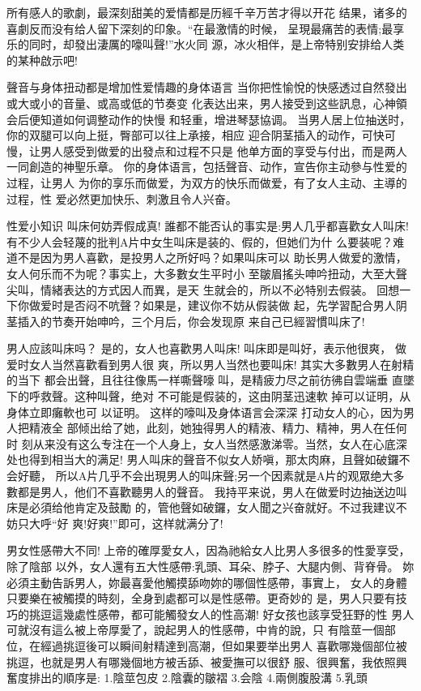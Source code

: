 \documentclass[12pt,UTF8]{ctexbook}
\begin{document}
所有感人的歌劇，最深刻甜美的爱情都是历經千辛万苦才得以开花
结果，诸多的喜劇反而没有给人留下深刻的印象。“在最激情的时候，
呈現最痛苦的表情;最享乐的同时，却發出淒厲的嚎叫聲!”水火同
源，冰火相伴，是上帝特别安排给人类的某种啟示吧!

聲音与身体扭动都是增加性爱情趣的身体语言
当你把性愉悅的快感透过自然發出或大或小的音量、或高或低的节奏变
化表达出来，男人接受到这些訊息，心神領会后便知道如何调整动作的快慢
和轻重，增进琴瑟協调。
当男人居上位抽送时，你的双腿可以向上挺，臀部可以往上承接，相应
迎合阴茎插入的动作，可快可慢，让男人感受到做爱的出發点和过程不只是
他单方面的享受与付出，而是两人一同創造的神聖乐章。
你的身体语言，包括聲音、动作，宣告你主动參与性爱的过程，让男人
为你的享乐而做爱，为双方的快乐而做爱，有了女人主动、主導的过程，性
爱必然更加快乐、刺激且令人兴奋。

性爱小知识
叫床何妨弄假成真!
誰都不能否认的事实是:男人几乎都喜歡女人叫床!
有不少人会轻蔑的批判A片中女生叫床是装的、假的，但她们为什
么要装呢？难道不是因为男人喜歡，是投男人之所好吗？如果叫床可以
助长男人做爱的激情，女人何乐而不为呢？事实上，大多數女生平时小
至皺眉搖头呻吟扭动，大至大聲尖叫，情緒表达的方式因人而異，是天
生就会的，所以不必特别去假装。
回想一下你做爱时是否闷不吭聲？如果是，建议你不妨从假装做
起，先学習配合男人阴茎插入的节奏开始呻吟，三个月后，你会发现原
来自己已經習慣叫床了!

男人应該叫床吗？
是的，女人也喜歡男人叫床!
叫床即是叫好，表示他很爽，
做爱时女人当然喜歡看到男人很
爽，所以男人当然也要叫床!
其实大多數男人在射精的当下
都会出聲，且往往像馬一样嘶聲嚎
叫，是精疲力尽之前彷彿自雲端垂
直墜下的呼救聲。这种叫聲，绝对
不可能是假装的，这由阴茎迅速軟
掉可以证明，从身体立即癱軟也可
以证明。
这样的嚎叫及身体语言会深深
打动女人的心，因为男人把精液全
部倾出给了她，此刻，她独得男人的精液、精力、精神，男人在任何时
刻从来没有这么专注在一个人身上，女人当然感激涕零。当然，女人在心底深处也得到相当大的满足!
男人叫床的聲音不似女人娇嗔，那太肉麻，且聲如破鑼不会好聽，
所以A片几乎不会出現男人的叫床聲;另一个因素就是A片的观眾绝大多
數都是男人，他们不喜歡聽男人的聲音。
我持平来说，男人在做爱时边抽送边叫床是必須给他肯定及鼓勵
的，管他聲如破鑼，女人聞之兴奋就好。不过我建议不妨只大呼“好
爽!好爽!”即可，这样就满分了!

男女性感帶大不同!
上帝的確厚愛女人，因為祂給女人比男人多很多的性愛享受，除了陰部
以外，女人還有五大性感帶:乳頭、耳朵、脖子、大腿内側、背脊骨。
妳必須主動告訴男人，妳最喜愛他觸摸舔吻妳的哪個性感帶，事實上，
女人的身體只要樂在被觸摸的時刻，全身到處都可以是性感帶。更奇妙的
是，男人只要有技巧的挑逗這幾處性感帶，都可能觸發女人的性高潮!
好女孩也該享受狂野的性
男人可就沒有這么被上帝厚愛了，說起男人的性感帶，中肯的說，只
有陰莖一個部位，在經過挑逗後可以瞬间射精達到高潮，但如果要举出男人
喜歡哪幾個部位被挑逗，也就是男人有哪幾個地方被舌舔、被愛撫可以很舒
服、很興奮，我依照興奮度排出的順序是:
1.陰莖包皮
2.陰囊的皺褶
3.会陰
4.兩側腹股溝
5.乳頭
\end{document}
